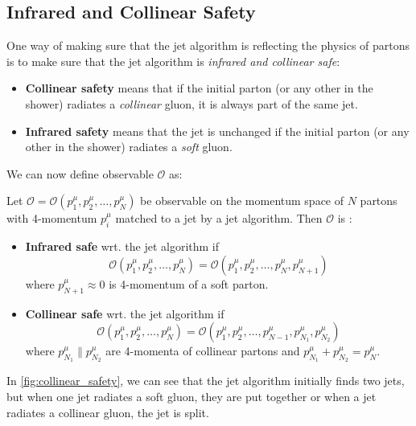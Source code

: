 \subsection{Infrared and Collinear Safety}
\label{sec:IR_coll_safe}
One way of making sure that the jet algorithm is reflecting the physics of partons is to make sure that the jet algorithm is \emph{infrared and collinear safe}:
\begin{itemize}
    \item \textbf{Collinear safety} means that if the initial parton (or any other in the shower) radiates a \emph{collinear} gluon, it is always part of the same jet.
    \item \textbf{Infrared safety} means that the jet is unchanged if the initial parton (or any other in the shower) radiates a \emph{soft} gluon.
\end{itemize}
We can now define \IRC observable $\mathcal{O}$ as:
\begin{defn}
    \label{def:IRC}

    Let $\mathcal{O} = \mathcal{O}(p_1^\mu, p_2^\mu, \dots, p_N^\mu)$ be observable on the momentum space of $N$ partons with 4-momentum $p_i^\mu$ matched to a jet by a jet algorithm.
    Then $\mathcal{O}$ is :
    \begin{itemize}
        \item \textbf{Infrared safe} wrt. the jet algorithm if 
        $$ \mathcal{O}(p_1^\mu, p_2^\mu, \dots, p_N^\mu) = \mathcal{O}(p_1^\mu, p_2^\mu, \dots, p_N^\mu, p_{N+1}^\mu) $$
        where $p_{N+1}^\mu \approx 0$ is 4-momentum of a soft parton.
        \item \textbf{Collinear safe} wrt. the jet algorithm if 
        $$ \mathcal{O}(p_1^\mu, p_2^\mu, \dots, p_N^\mu) = \mathcal{O}(p_1^\mu, p_2^\mu, \dots,p_{N-1}^\mu, p_{N_1}^\mu, p_{N_2}^\mu) $$
        where $p_{N_1}^\mu \parallel p_{N_2}^\mu$ are 4-momenta of collinear partons and $p_{N_1}^\mu + p_{N_2}^\mu = p_{N}^\mu$.
    \end{itemize}
\end{defn}

In \cref{fig:collinear_safety}, we can see that the jet algorithm initially finds two jets, but when one jet radiates a soft gluon, they are put together or when a jet radiates a collinear gluon, the jet is split.

